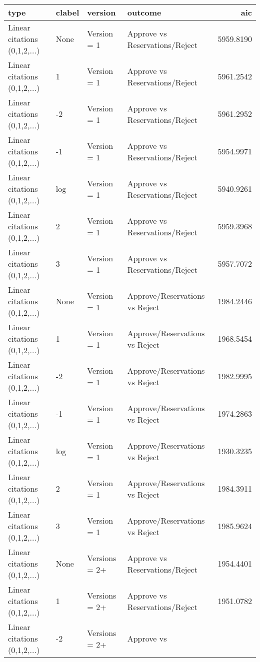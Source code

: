 \begin{table}[ht]
\centering
\begin{tabular}{llllr}
 type & clabel & version & outcome & aic \\ 
  \hline
Linear citations (0,1,2,...) & None & Version = 1 & Approve vs
Reservations/Reject & 5959.8190 \\ 
  Linear citations (0,1,2,...) & 1 & Version = 1 & Approve vs
Reservations/Reject & 5961.2542 \\ 
  Linear citations (0,1,2,...) & -2 & Version = 1 & Approve vs
Reservations/Reject & 5961.2952 \\ 
  Linear citations (0,1,2,...) & -1 & Version = 1 & Approve vs
Reservations/Reject & 5954.9971 \\ 
  Linear citations (0,1,2,...) & log & Version = 1 & Approve vs
Reservations/Reject & 5940.9261 \\ 
  Linear citations (0,1,2,...) & 2 & Version = 1 & Approve vs
Reservations/Reject & 5959.3968 \\ 
  Linear citations (0,1,2,...) & 3 & Version = 1 & Approve vs
Reservations/Reject & 5957.7072 \\ 
  Linear citations (0,1,2,...) & None & Version = 1 & Approve/Reservations
vs Reject & 1984.2446 \\ 
  Linear citations (0,1,2,...) & 1 & Version = 1 & Approve/Reservations
vs Reject & 1968.5454 \\ 
  Linear citations (0,1,2,...) & -2 & Version = 1 & Approve/Reservations
vs Reject & 1982.9995 \\ 
  Linear citations (0,1,2,...) & -1 & Version = 1 & Approve/Reservations
vs Reject & 1974.2863 \\ 
  Linear citations (0,1,2,...) & log & Version = 1 & Approve/Reservations
vs Reject & 1930.3235 \\ 
  Linear citations (0,1,2,...) & 2 & Version = 1 & Approve/Reservations
vs Reject & 1984.3911 \\ 
  Linear citations (0,1,2,...) & 3 & Version = 1 & Approve/Reservations
vs Reject & 1985.9624 \\ 
  Linear citations (0,1,2,...) & None & Versions = 2+ & Approve vs
Reservations/Reject & 1954.4401 \\ 
  Linear citations (0,1,2,...) & 1 & Versions = 2+ & Approve vs
Reservations/Reject & 1951.0782 \\ 
  Linear citations (0,1,2,...) & -2 & Versions = 2+ & Approve vs

\end{tabular}
\end{table}
